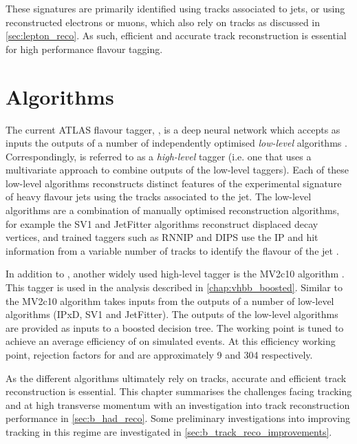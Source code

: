 These signatures are primarily identified using tracks associated to jets, or using reconstructed electrons or muons, which also rely on tracks as discussed in \cref{sec:lepton_reco}.
As such, efficient and accurate track reconstruction is essential for high performance flavour tagging.



\section{\texorpdfstring{\btagging}{b-tagging} Algorithms}


The current ATLAS flavour tagger, \DLr \cite{ATL-PHYS-PUB-2017-013}, is a deep neural network which accepts as inputs the outputs of a number of independently optimised \textit{low-level} algorithms \cite{FTAG-2018-01}.
Correspondingly, \DLr is referred to as a \textit{high-level} tagger (i.e. one that uses a multivariate approach to combine outputs of the low-level taggers).
Each of these low-level algorithms reconstructs distinct features of the experimental signature of heavy flavour jets using the tracks associated to the jet.
The low-level algorithms are a combination of manually optimised reconstruction algorithms, for example the SV1 and JetFitter algorithms reconstruct displaced decay vertices, and trained taggers such as RNNIP and DIPS use the IP and hit information from a variable number of tracks to identify the flavour of the jet \cite{FTAG-2018-01,ATL-PHYS-PUB-2017-011,ATL-PHYS-PUB-2017-003,ATL-PHYS-PUB-2020-014}.

In addition to \DLr, another widely used high-level tagger is the MV2c10 algorithm \cite{ATL-PHYS-PUB-2015-022,FTAG-2018-01,ATL-PHYS-PUB-2017-013}.
This tagger is used in the analysis described in \cref{chap:vhbb_boosted}.
Similar to \DLr the MV2c10 algorithm takes inputs from the outputs of a number of low-level algorithms (IPxD, SV1 and JetFitter).
The outputs of the low-level algorithms are provided as inputs to a boosted decision tree.
The working point is tuned to achieve an average \bjet efficiency of  on simulated \ttbar events.
At this efficiency working point, rejection factors for \cjets and \ljets are approximately 9 and 304 respectively.

As the different \btagging algorithms ultimately rely on tracks, accurate and efficient track reconstruction is essential.
This chapter summarises the challenges facing tracking and \btagging at high transverse momentum with an investigation into track reconstruction performance in \cref{sec:b_had_reco}.
Some preliminary investigations into improving tracking in this regime are investigated in \cref{sec:b_track_reco_improvements}.



